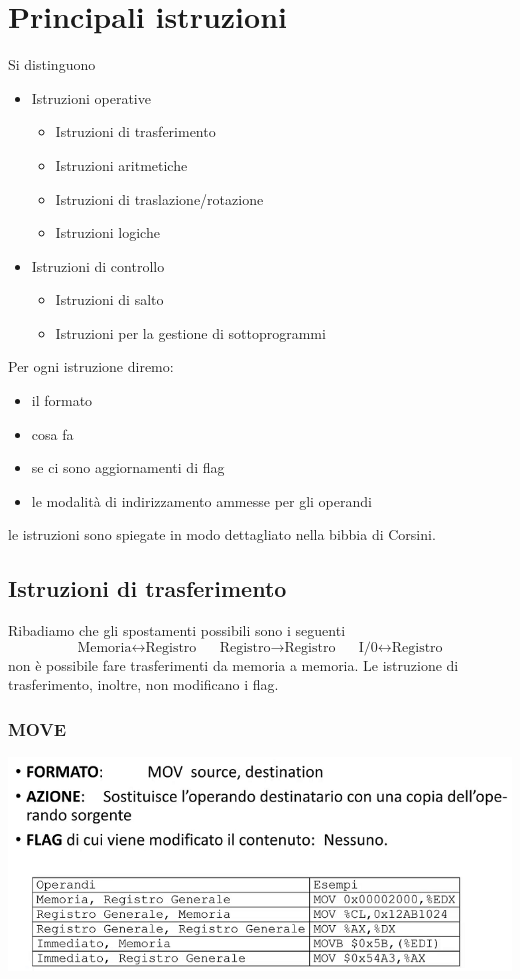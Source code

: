 \documentclass[11pt]{report}
\begin{document}
\section{Principali istruzioni}
Si distinguono 
\begin{itemize}
\item Istruzioni operative
\begin{multicols}{2}\begin{itemize}
\item Istruzioni di trasferimento
\item Istruzioni aritmetiche
\item Istruzioni di traslazione/rotazione
\item Istruzioni logiche
\end{itemize}
\end{multicols}
\item Istruzioni di controllo
\begin{itemize}
\item Istruzioni di salto
\item Istruzioni per la gestione di sottoprogrammi
\end{itemize}
\end{itemize}
Per ogni istruzione diremo:
\begin{itemize}
\item il formato
\item cosa fa
\item se ci sono aggiornamenti di flag
\item le modalità di indirizzamento ammesse per gli operandi
\end{itemize}
le istruzioni sono spiegate in modo dettagliato nella bibbia di Corsini.
\subsection{Istruzioni di trasferimento}
Ribadiamo che gli spostamenti possibili sono i seguenti
\[\boxed{\text{Memoria} \longleftrightarrow \text{Registro}}\;\;\;\;\boxed{\text{Registro} \longrightarrow \text{Registro}}\;\;\;\;\boxed{\text{I/0} \longleftrightarrow \text{Registro}}\]
non è possibile fare trasferimenti da memoria a memoria. Le istruzione di trasferimento, inoltre, non modificano i flag.
\subsubsection{MOVE}
\begin{center}
\includegraphics{img/7.PNG}
\end{center}
\end{document}
